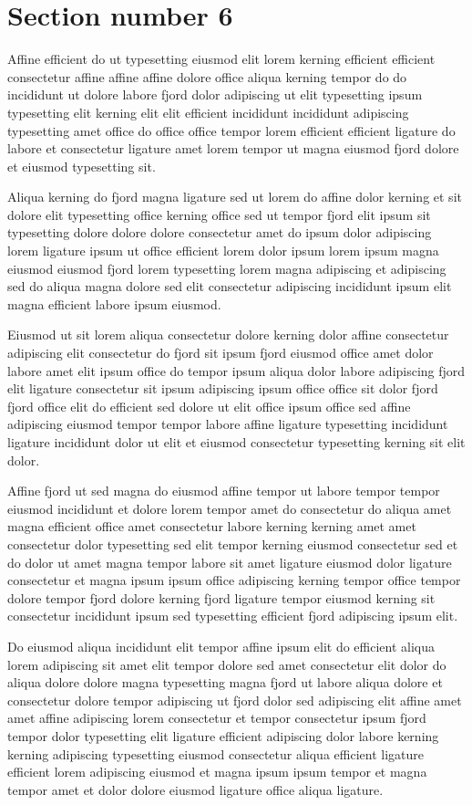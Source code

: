 \documentclass[11pt]{article}
\begin{document}
\section{Section number 6}\label{sec:s6}
Affine efficient do ut typesetting eiusmod elit lorem kerning efficient efficient consectetur affine affine affine dolore office aliqua kerning tempor do do incididunt ut dolore labore fjord dolor adipiscing ut elit typesetting ipsum typesetting elit kerning elit elit efficient incididunt incididunt adipiscing typesetting amet office do office office tempor lorem efficient efficient ligature do labore et consectetur ligature amet lorem tempor ut magna eiusmod fjord dolore et eiusmod typesetting sit.

Aliqua kerning do fjord magna ligature sed ut lorem do affine dolor kerning et sit dolore elit typesetting office kerning office sed ut tempor fjord elit ipsum sit typesetting dolore dolore dolore consectetur amet do ipsum dolor adipiscing lorem ligature ipsum ut office efficient lorem dolor ipsum lorem ipsum magna eiusmod eiusmod fjord lorem typesetting lorem magna adipiscing et adipiscing sed do aliqua magna dolore sed elit consectetur adipiscing incididunt ipsum elit magna efficient labore ipsum eiusmod.

Eiusmod ut sit lorem aliqua consectetur dolore kerning dolor affine consectetur adipiscing elit consectetur do fjord sit ipsum fjord eiusmod office amet dolor labore amet elit ipsum office do tempor ipsum aliqua dolor labore adipiscing fjord elit ligature consectetur sit ipsum adipiscing ipsum office office sit dolor fjord fjord office elit do efficient sed dolore ut elit office ipsum office sed affine adipiscing eiusmod tempor tempor labore affine ligature typesetting incididunt ligature incididunt dolor ut elit et eiusmod consectetur typesetting kerning sit elit dolor.

Affine fjord ut sed magna do eiusmod affine tempor ut labore tempor tempor eiusmod incididunt et dolore lorem tempor amet do consectetur do aliqua amet magna efficient office amet consectetur labore kerning kerning amet amet consectetur dolor typesetting sed elit tempor kerning eiusmod consectetur sed et do dolor ut amet magna tempor labore sit amet ligature eiusmod dolor ligature consectetur et magna ipsum ipsum office adipiscing kerning tempor office tempor dolore tempor fjord dolore kerning fjord ligature tempor eiusmod kerning sit consectetur incididunt ipsum sed typesetting efficient fjord adipiscing ipsum elit.

Do eiusmod aliqua incididunt elit tempor affine ipsum elit do efficient aliqua lorem adipiscing sit amet elit tempor dolore sed amet consectetur elit dolor do aliqua dolore dolore magna typesetting magna fjord ut labore aliqua dolore et consectetur dolore tempor adipiscing ut fjord dolor sed adipiscing elit affine amet amet affine adipiscing lorem consectetur et tempor consectetur ipsum fjord tempor dolor typesetting elit ligature efficient adipiscing dolor labore kerning kerning adipiscing typesetting eiusmod consectetur aliqua efficient ligature efficient lorem adipiscing eiusmod et magna ipsum ipsum tempor et magna tempor amet et dolor dolore eiusmod ligature office aliqua ligature.
\end{document}
